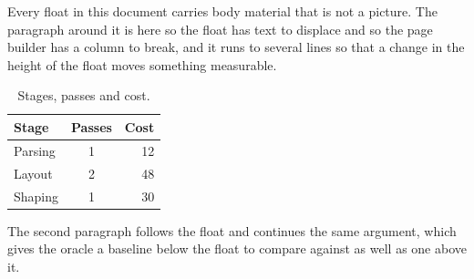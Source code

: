 \documentclass{article}
\begin{document}
Every float in this document carries body material that is not a
picture. The paragraph around it is here so the float has text to displace and
so the page builder has a column to break, and it runs to several lines so that
a change in the height of the float moves something measurable.

\begin{table}[h]
\centering
\caption{Stages, passes and cost.}
\label{tab:above}
\begin{tabular}{|l|c|r|}
\hline
Stage & Passes & Cost \\
\hline
Parsing & 1 & 12 \\
Layout & 2 & 48 \\
Shaping & 1 & 30 \\
\hline
\end{tabular}
\end{table}

The second paragraph follows the float and continues the same
argument, which gives the oracle a baseline below the float to compare against
as well as one above it.
\end{document}
